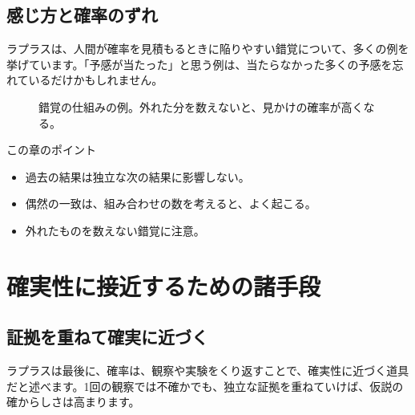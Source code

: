 \documentclass[a4paper,11pt,openany]{ltjsbook}
\begin{document}
\section{感じ方と確率のずれ}

ラプラスは、人間が確率を見積もるときに陥りやすい錯覚について、多くの例を挙げています。「予感が当たった」と思う例は、当たらなかった多くの予感を忘れているだけかもしれません。

\begin{figure}[htbp]
\centering
{}
\caption{錯覚の仕組みの例。外れた分を数えないと、見かけの確率が高くなる。}
\end{figure}

\begin{pointbox}{この章のポイント}
\begin{itemize}[leftmargin=1.5em]
\item 過去の結果は独立な次の結果に影響しない。
\item 偶然の一致は、組み合わせの数を考えると、よく起こる。
\item 外れたものを数えない錯覚に注意。
\end{itemize}
\end{pointbox}

\chapter{確実性に接近するための諸手段}

\section{証拠を重ねて確実に近づく}

ラプラスは最後に、確率は、観察や実験をくり返すことで、確実性に近づく道具だと述べます。1回の観察では不確かでも、独立な証拠を重ねていけば、仮説の確からしさは高まります。
\end{document}
